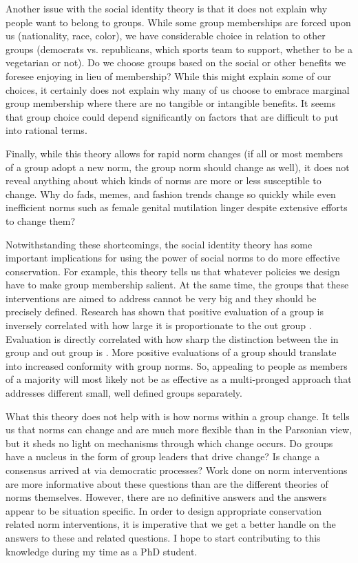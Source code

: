 \documentclass[rutwik_proposal.tex]{subfiles}
\begin{document}
Another issue with the social identity theory is that it does not explain why people want to belong to groups. While some group memberships are forced upon us (nationality, race, color), we have considerable choice in relation to other groups (democrats vs. republicans, which sports team to support, whether to be a vegetarian or not). Do we choose groups based on the social or other benefits we foresee enjoying in lieu of membership? While this might explain some of our choices, it certainly does not explain why many of us choose to embrace marginal group membership where there are no tangible or intangible benefits. It seems that group choice could depend significantly on factors that are difficult to put into rational terms.

Finally, while this theory allows for rapid norm changes (if all or most members of a group adopt a new norm, the group norm should change as well), it does not reveal anything about which kinds of norms are more or less susceptible to change. Why do fads, memes, and fashion trends change so quickly while even inefficient norms such as female genital mutilation linger despite extensive efforts to change them?

Notwithstanding these shortcomings, the social identity theory has some important implications for using the power of social norms to do more effective conservation. For example, this theory tells us that whatever policies we design have to make group membership salient. At the same time, the groups that these interventions are aimed to address cannot be very big and they should be precisely defined. Research has shown that positive evaluation of a group is inversely correlated with how large it is proportionate to the out group . Evaluation is directly correlated with how sharp the distinction between the in group and out group is \cite{Mullen92}. More positive evaluations of a group should translate into increased conformity with group norms. So, appealing to people as members of a majority will most likely not be as effective as a multi-pronged approach that addresses different small, well defined groups separately.

What this theory does not help with is how norms within a group change. It tells us that norms can change and are much more flexible than in the Parsonian view, but it sheds no light on mechanisms through which change occurs. Do groups have a nucleus in the form of group leaders that drive change? Is change a consensus arrived at via democratic processes? Work done on norm interventions are more informative about these questions than are the different theories of norms themselves. However, there are no definitive answers and the answers appear to be situation specific. In order to design appropriate conservation related norm interventions, it is imperative that we get a better handle on the answers to these and related questions. I hope to start contributing to this knowledge during my time as a PhD student. 
\end{document}
